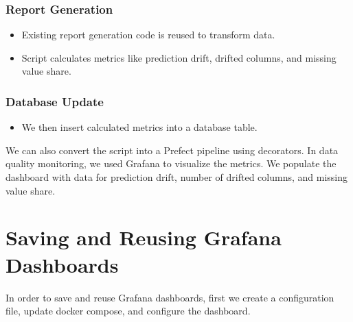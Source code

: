 \documentclass[letterpaper,12pt,notitlepage,twoside]{report}
\begin{document}
\subsubsection{Report Generation}
\begin{itemize}[noitemsep, topsep=0pt]
\item Existing report generation code is reused to transform data.
\item Script calculates metrics like prediction drift, drifted columns, and missing value share.
\end{itemize}
\subsubsection{Database Update}
\begin{itemize}[noitemsep, topsep=0pt]
\item We then insert calculated metrics into a database table.
\end{itemize}
We can also convert the script into a Prefect pipeline using decorators. In data quality monitoring, we used Grafana to visualize the metrics. We populate the dashboard with data for prediction drift, number of drifted columns, and missing value share.

\section{Saving and Reusing Grafana Dashboards}
In order to save and reuse Grafana dashboards, first we create a configuration file, update docker compose, and configure the dashboard.
\end{document}
